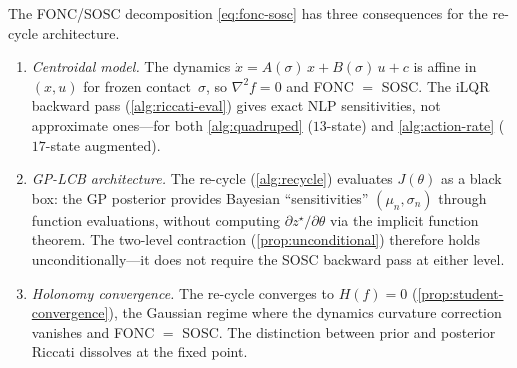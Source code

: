 \begin{remark}
\label{rem:fonc-recycle}
The FONC/SOSC decomposition \eqref{eq:fonc-sosc} has three
consequences for the re-cycle architecture.
\begin{enumerate}[label=(\roman*),nosep]
\item \emph{Centroidal model.}
  The dynamics $\dot x = A(\sigma)\,x + B(\sigma)\,u + c$ is
  affine in $(x, u)$ for frozen contact~$\sigma$, so
  $\nabla^2 f = 0$ and FONC $=$ SOSC\@.
  The iLQR backward pass (\cref{alg:riccati-eval}) gives
  exact NLP sensitivities, not approximate ones---for
  both \cref{alg:quadruped} ($13$-state) and
  \cref{alg:action-rate} ($17$-state augmented).
\item \emph{GP-LCB architecture.}
  The re-cycle (\cref{alg:recycle}) evaluates $J(\theta)$
  as a black box: the GP posterior provides Bayesian
  ``sensitivities'' $(\mu_n, \sigma_n)$ through function
  evaluations, without computing
  $\partial z^\star/\partial\theta$ via the implicit function
  theorem.
  The two-level contraction (\cref{prop:unconditional})
  therefore holds unconditionally---it does not require
  the SOSC backward pass at either level.
\item \emph{Holonomy convergence.}
  The re-cycle converges to $H(f) = 0$
  (\cref{prop:student-convergence}), the Gaussian regime
  where the dynamics curvature correction vanishes and
  FONC $=$ SOSC\@.
  The distinction between prior and posterior Riccati
  dissolves at the fixed point.
\end{enumerate}
\end{remark}

